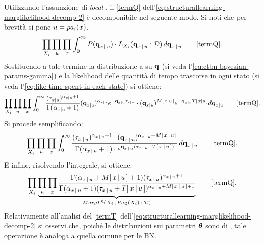 Utilizzando l'assunzione di \emph{local }, il \autoref{termQ} dell'\autoref{eq:structurallearning-marglikelihood-decomp-2} è decomponibile nel seguente modo. Si noti che per brevità si pone $\mathnormal{u}=pa_i(\mathnormal{x})$.
\[
\prod_{\setel{X}_i} \prod_{\setel{u}} \prod_{\setel{x}} \int_0^\infty P(\param{q}_{\setel{x}\,\arrowvert\,\setel{u}}) \cdot L_{\setel{X}_i}(\param{q}_{\setel{x}\,\arrowvert\,\setel{u}}:\conceptsym{D}) \, d\param{q}_{\setel{x}\,\arrowvert\,\setel{u}} \tag*{\ref{termQ}} \text{.}
\]
Sostituendo a tale termine la distribuzione a  su $\boldsymbol{\textbf{\text{q}}}$ (si veda l'\autoref{eq:ctbn-bayesian-params-gamma}) e la likelihood delle quantità di tempo trascorse in ogni stato (si veda l'\autoref{eq:like-time-spent-in-each-state}) si ottiene:
\footnotesize
\[
\prod_{\setel{X}_i} \prod_{\setel{u}} \prod_{\setel{x}} \int_0^\infty \frac{(\tau_{\setel{x}\arrowvert\setel{u}})^{\alpha_{\setel{x}\arrowvert\setel{u}}+1}}{\Gamma({\alpha_{\setel{x}\arrowvert\setel{u}}+1})} (\param{q}_{\setel{x}\arrowvert\setel{u}})^{\alpha_{\setel{x}\arrowvert\setel{u}}} e^{-\param{q}_{\setel{x}\arrowvert\setel{u}}\tau_{\setel{x}\arrowvert\setel{u}}} \cdot (\param{q}_{x\arrowvert\setel{u}})^{\mstat{x\arrowvert\setel{u}}} e^{-\param{q}_{\setel{x}\arrowvert\setel{u}}\tstat{\setel{x}\arrowvert\setel{u}}} d\param{q}_{\setel{x}\arrowvert\setel{u}} \tag*{\ref{termQ}} \text{\normalsize .}
\]
\normalsize
Si procede semplificando:
\[
\prod_{\setel{X}_i} \prod_{\setel{u}} \prod_{\setel{x}} \int_0^\infty \frac{(\tau_{\setel{x}\,\arrowvert\,\setel{u}})^{\alpha_{\setel{x}\,\arrowvert\,\setel{u}}+1} \cdot (\param{q}_{\setel{x}\,\arrowvert\,\setel{u}})^{\alpha_{\setel{x}\,\arrowvert\,\setel{u}}+\mstat{x\,\arrowvert\,\setel{u}}}}{\Gamma({\alpha_{\setel{x}\,\arrowvert\,\setel{u}}+1}) \cdot e^{\param{q}_{\setel{x}\,\arrowvert\,\setel{u}}(\tau_{\setel{x}\,\arrowvert\,\setel{u}}+\tstat{\setel{x}\,\arrowvert\,\setel{u}})}}  \, d\param{q}_{\setel{x}\,\arrowvert\,\setel{u}} \tag*{\ref{termQ}} \text{.}
\]
E infine, risolvendo l'integrale, si ottiene:
\[
\prod_{\setel{X}_i} \underbrace{\prod_{\setel{u}} \prod_{\setel{x}} \frac{\Gamma(\alpha_{\setel{x}\,\arrowvert\,\setel{u}}+\mstat{x\,\arrowvert\,\setel{u}}+1)(\tau_{\setel{x}\,\arrowvert\,\setel{u}})^{\alpha_{\setel{x}\,\arrowvert\,\setel{u}}+1}}{\Gamma(\alpha_{\setel{x}\,\arrowvert\,\setel{u}}+1)(\tau_{\setel{x}\,\arrowvert\,\setel{u}}+\tstat{\setel{x}\,\arrowvert\,\setel{u}})^{\alpha_{\setel{x}\,\arrowvert\,\setel{u}}+\mstat{x\,\arrowvert\,\setel{u}}+1}}}_\text{$MargL^{\param{q}}(\setel{X}_i\,,Pa_{\conceptsym{G}}(\setel{X}_i):\conceptsym{D})$} \tag*{\ref{termQ}} \text{.}
\]
Relativamente all'analisi del \autoref{termT} dell'\autoref{eq:structurallearning-marglikelihood-decomp-2} si osservi che, poiché le distribuzioni sui parametri $\boldsymbol{\textbf{\text{$\theta$}}}$ sono di \emph{}, tale operazione è analoga a quella comune per le \acl{BN}.


